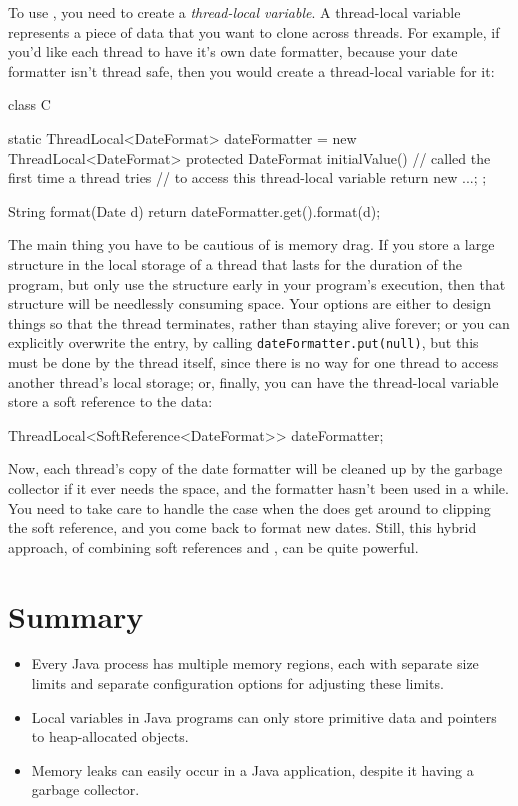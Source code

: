 To use \tls, you need to create a \emph{thread-local variable}. A thread-local
variable represents a piece of data that you want to clone across threads. For
example, if you'd like each thread to have it's own date formatter, because your
date formatter isn't thread safe, then you would create a thread-local variable
for it:
\begin{shortlisting}
class C {
   static ThreadLocal<DateFormat> dateFormatter = new ThreadLocal<DateFormat> {
      protected DateFormat initialValue() {
         // called the first time a thread tries
         // to access this thread-local variable
         return new ...;
      }
   };
   
   String format(Date d) {
      return dateFormatter.get().format(d);
   }
}
\end{shortlisting}
The main thing you have to be cautious of is memory drag. If you store a large
structure in the local storage of a thread that lasts for the duration of the
program, but only use the structure early in your program's execution, then that
structure will be needlessly consuming space. Your options are either to design
things so that the thread terminates, rather than staying alive forever; or you
can explicitly overwrite the entry, by calling {\tt dateFormatter.put(null)},
but this must be done by the thread itself, since there is no way for one thread
to access another thread's local storage; or, finally, you can have the
thread-local variable store a soft reference to the data:
\begin{shortlisting}
ThreadLocal<SoftReference<DateFormat>> dateFormatter;
\end{shortlisting}
Now, each thread's copy of the date formatter will be cleaned up by the garbage
collector if it ever needs the space, and the formatter hasn't been used in a
while. You need to take care to handle the case when the \jre does get around to
clipping the soft reference, and you come back to format new dates. Still, this
hybrid approach, of combining soft references and \tls, can be quite powerful.

\section{Summary}


\begin{itemize}
  \item Every Java process has multiple memory regions, each with separate size
  limits and separate configuration options for adjusting these limits.
  \item Local variables in Java programs can only store primitive data and
  pointers to heap-allocated objects.
  \item Memory leaks can easily occur in a Java application, despite it having a
  garbage collector.
\end{itemize}